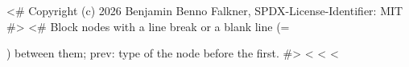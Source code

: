 <# Copyright (c) 2026 Benjamin Benno Falkner, SPDX-License-Identifier: MIT #>
<# Block nodes with a line break or a blank line (= \par) between them; prev: type of the node before the first. #>
<%
<%
<%
